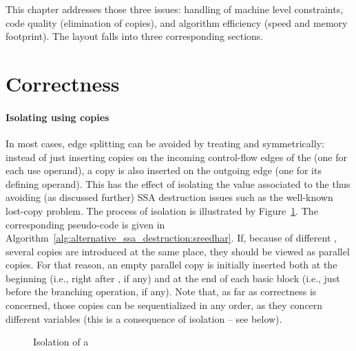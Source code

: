 This chapter addresses those three issues: 
handling of machine level constraints, code quality (elimination of copies), and algorithm efficiency (speed and memory footprint). 
The layout falls into three corresponding sections.

\section{Correctness}

\paragraph{Isolating \phinode using copies}
In most cases, edge splitting can be avoided by treating \phiuses and \phidef symmetrically: 
instead of just inserting copies on the incoming control-flow edges of the \emph{\phinode} (one for each use operand), a copy is also inserted on the outgoing edge (one for its defining operand). 
This has the effect of isolating the value associated to the \phinode thus avoiding (as discussed further) SSA destruction issues such as the well-known lost-copy problem. 
The process of \phinode isolation is illustrated by Figure~\ref{fig:phi_isolation}. 
The corresponding pseudo-code is given in Algorithm~\ref{alg:alternative_ssa_destruction:sreedhar}. 
If, because of different \phifuns, several copies are introduced at the same place, they should be viewed as parallel copies. 
For that reason, an empty parallel copy is initially inserted both at the beginning (i.e., right after \phifuns, if any) and at the end of each basic block (i.e., just before the branching operation, if any). 
Note that, as far as correctness is concerned, those copies can be sequentialized in any order, as they concern different variables (this is a consequence of \phinode isolation -- see below).

\begin{figure}[h]
  \hfill
{}\hfill
{}
\hfill\strut
\caption{Isolation of a \phinode\label{fig:phi_isolation}}
\end{figure}


